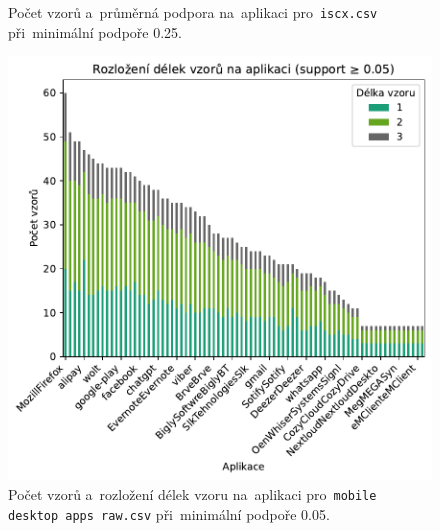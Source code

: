 \begin{figure}[H]
\begin{minipage}[t]{0.49\textwidth}
        \caption{Počet vzorů a~průměrná podpora na~aplikaci pro~\texttt{iscx.csv} při~minimální podpoře 0.25.}
        \label{fig:appendix-}
    \end{minipage}
\end{figure}

\begin{figure}[H]
    \centering
    \begin{minipage}[t]{0.49\textwidth}
        \centering
    \includegraphics[width=\linewidth]{obrazky-figures/exps/pattern_lengths_0.05_mobile.pdf}
        \caption{Počet vzorů a~rozložení délek vzoru na~aplikaci pro~\texttt{mobile desktop apps raw.csv} při~minimální podpoře 0.05.}
    \label{fig:appendix-}
    \end{minipage}%
    \hfill
    \begin{minipage}[t]{0.49\textwidth}
       \centering

\end{minipage}
\end{figure}
